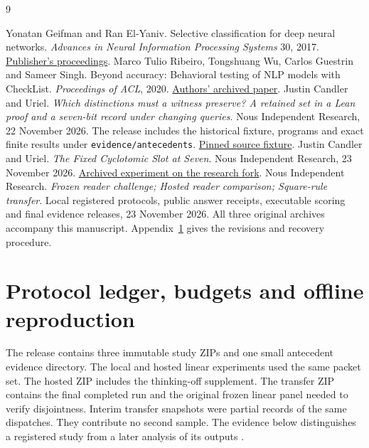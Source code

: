 \documentclass[12pt,letterpaper]{article}
\begin{document}
\begin{thebibliography}{9}
 Yonatan Geifman and Ran El-Yaniv. Selective classification for deep neural networks. \emph{Advances in Neural Information Processing Systems} 30, 2017. \href{https://papers.nips.cc/paper/2017/hash/4a8423d5e91fda00bb7e46540e2b0cf1-Abstract.html}{Publisher's proceedings}.
 Marco Tulio Ribeiro, Tongshuang Wu, Carlos Guestrin and Sameer Singh. Beyond accuracy: Behavioral testing of NLP models with CheckList. \emph{Proceedings of ACL}, 2020. \href{https://arxiv.org/abs/2005.04118}{Authors' archived paper}.
 Justin Candler and Uriel. \emph{Which distinctions must a witness preserve? A retained set in a Lean proof and a seven-bit record under changing queries}. Nous Independent Research, 22 November 2026. The release includes the historical fixture, programs and exact finite results under \texttt{evidence/antecedents}. \href{https://github.com/nousentllc/riemann-hypothesis/blob/4b1c9fbbfb9bc50a3f791c2c1f3d7f2adb336c87/research/uriel/experiments/slot-three/results/weights.json}{Pinned source fixture}.
 Justin Candler and Uriel. \emph{The Fixed Cyclotomic Slot at Seven}. Nous Independent Research, 23 November 2026. \href{https://github.com/nousentllc/riemann-hypothesis/tree/ce9d6fae89167d160b9d256df788a6b493cdba9a/research/uriel/experiments/cyclotomic-slot-seven}{Archived experiment on the research fork}.
 Nous Independent Research. \emph{Frozen reader challenge; Hosted reader comparison; Square-rule transfer}. Local registered protocols, public answer receipts, executable scoring and final evidence releases, 23 November 2026. All three original archives accompany this manuscript. Appendix~\ref{sec:replay} gives the revisions and recovery procedure.
\end{thebibliography}


\appendix
\section{Protocol ledger, budgets and offline reproduction}\label{sec:replay}
The release contains three immutable study ZIPs and one small antecedent evidence directory. The local and hosted linear experiments used the same packet set. The hosted ZIP includes the thinking-off supplement. The transfer ZIP contains the final completed run and the original frozen linear panel needed to verify disjointness. Interim transfer snapshots were partial records of the same dispatches. They contribute no second sample. The evidence below distinguishes a registered study from a later analysis of its outputs \cite{runs}.
\end{document}
